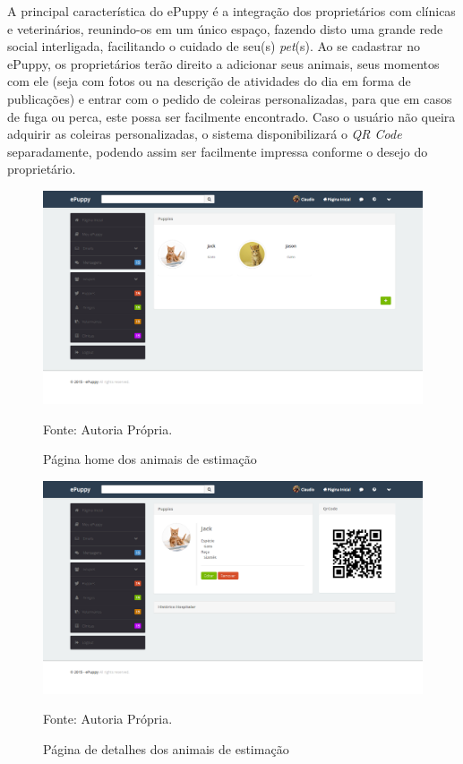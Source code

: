 A principal característica do ePuppy é a integração dos proprietários com clínicas e veterinários, reunindo-os em um único espaço, fazendo disto uma grande rede social interligada, facilitando o cuidado de seu(s) {\it pet}(s). Ao se cadastrar no ePuppy, os proprietários terão direito a adicionar seus animais, seus momentos com ele (seja com fotos ou na descrição de atividades do dia em forma de publicações) e entrar com o pedido de coleiras personalizadas, para que em casos de fuga ou perca, este possa ser facilmente encontrado. Caso o usuário não queira adquirir as coleiras personalizadas, o sistema disponibilizará o {\it QR Code} separadamente, podendo assim ser facilmente impressa conforme o desejo do proprietário.
\begin{figure}[h!]
	\center	\includegraphics[scale=0.22
	]{imagens/animais1}
	\caption{Página home dos animais de estimação}
	Fonte: Autoria Própria.
	\label{Rotulo}
\end{figure}
\begin{figure}[h!]
	\center	\includegraphics[scale=0.22
	]{imagens/animais2}
	\caption{Página de detalhes dos animais de estimação}
	Fonte: Autoria Própria.
	\label{Rotulo}
\end{figure}

